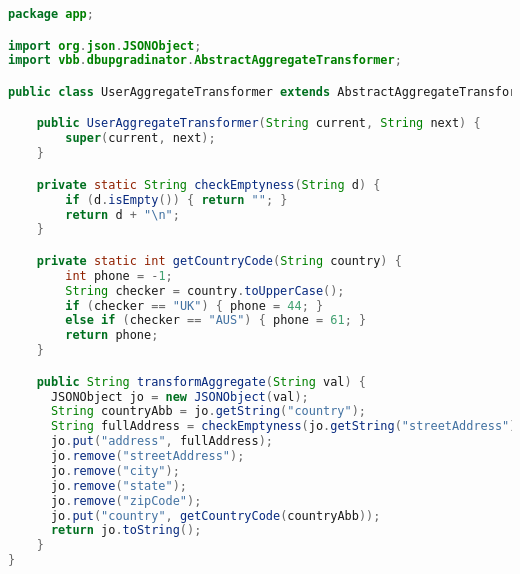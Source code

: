 \begin{lstlisting}[language=Java, label=uat, caption={Transformasjonsklasse for aggregat som holdeer data om registrerte brukere i WebShop.}]
package app;

import org.json.JSONObject;
import vbb.dbupgradinator.AbstractAggregateTransformer;

public class UserAggregateTransformer extends AbstractAggregateTransformer {

    public UserAggregateTransformer(String current, String next) {
        super(current, next);
    }

    private static String checkEmptyness(String d) {
        if (d.isEmpty()) { return ""; }
        return d + "\n";
    }

    private static int getCountryCode(String country) {
        int phone = -1;
        String checker = country.toUpperCase();
        if (checker == "UK") { phone = 44; }
        else if (checker == "AUS") { phone = 61; }
        return phone;
    }

    public String transformAggregate(String val) {
      JSONObject jo = new JSONObject(val);
      String countryAbb = jo.getString("country");
      String fullAddress = checkEmptyness(jo.getString("streetAddress")) + checkEmptyness(jo.getString("city")) + checkEmptyness(jo.getString("state")) + checkEmptyness(jo.getString("zipCode")) + checkEmptyness(countryAbb);
      jo.put("address", fullAddress);
      jo.remove("streetAddress");
      jo.remove("city");
      jo.remove("state");
      jo.remove("zipCode");
      jo.put("country", getCountryCode(countryAbb));
      return jo.toString();
    }
}
\end{lstlisting}
